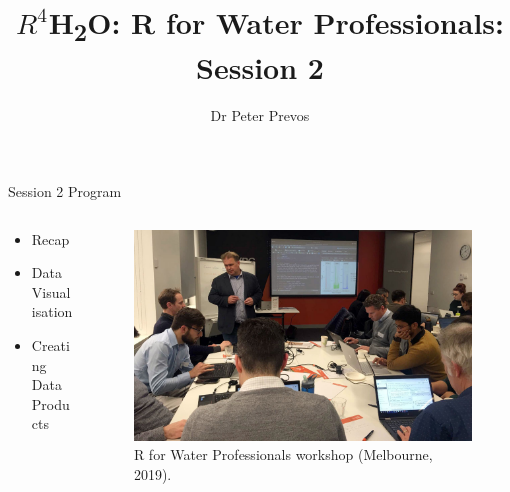 \documentclass[
  ignorenonframetext,
]{beamer}
\title{\(R^4\)H\textsubscript{2}O: R for Water Professionals: Session 2}
\author{Dr Peter Prevos}
\date{}
\providecommand{\tightlist}{%
  \setlength{\itemsep}{0pt}\setlength{\parskip}{0pt}}
\begin{document}
\frame{\titlepage}

\begin{frame}{Session 2 Program}
\protect\hypertarget{session-2-program}{}
\begin{columns}[T]
\begin{column}{0.48\textwidth}
\begin{itemize}
\tightlist
\item
  Recap
\item
  Data Visualisation
\item
  Creating Data Products
\end{itemize}
\end{column}

\begin{column}{0.48\textwidth}
\begin{figure}
\centering
\includegraphics{../manuscript/resources/01_introduction/2019_workshop_melbourne.jpg}
\caption{R for Water Professionals workshop (Melbourne, 2019).}
\end{figure}
\end{column}
\end{columns}
\end{frame}
\end{document}
